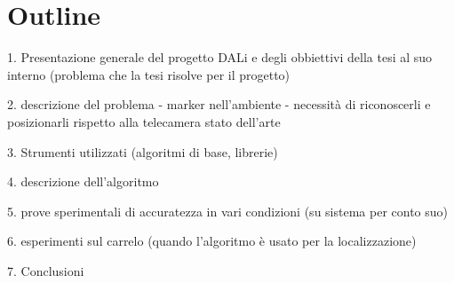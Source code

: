 \section{Outline}

1. Presentazione generale del progetto DALi e degli obbiettivi della tesi al suo interno (problema che la tesi risolve per il progetto)

2. descrizione del problema
        - marker nell’ambiente
        - necessità di riconoscerli e posizionarli rispetto alla telecamera
   stato dell’arte

3. Strumenti utilizzati (algoritmi di base, librerie)

4. descrizione dell’algoritmo

5. prove sperimentali di accuratezza in vari condizioni (su sistema per conto suo)

6. esperimenti sul carrelo (quando l’algoritmo è usato per la localizzazione)

7. Conclusioni






  
